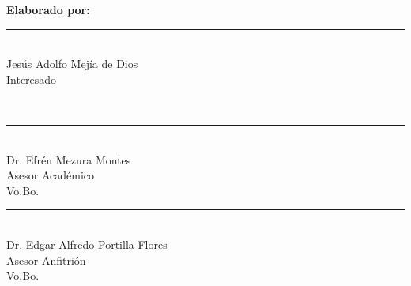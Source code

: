 \documentclass[12pt,letterpaper, xcolor=table, x11names]{article}
\begin{document}
\vspace{1cm}
\begin{center}
	\textbf{Elaborado por:}
	\\[3cm]
	\begin{minipage}{.4\textwidth}
		\centering
		\rule{\textwidth}{1pt}\\
		Jesús Adolfo Mejía de Dios\\
		Interesado
	\end{minipage}
	\\[3cm]
	\begin{minipage}{.4\textwidth}
		\centering
		\rule{\textwidth}{1pt}\\
		Dr. Efrén Mezura Montes\\
		Asesor Académico\\
		Vo.Bo.
	\end{minipage}
	\hspace{1cm}
	\begin{minipage}{.4\textwidth}
		\centering
		\rule{\textwidth}{1pt}\\
		Dr. Edgar Alfredo Portilla Flores\\
		Asesor Anfitrión\\
		Vo.Bo.
	\end{minipage}

\end{center}
\end{document}
